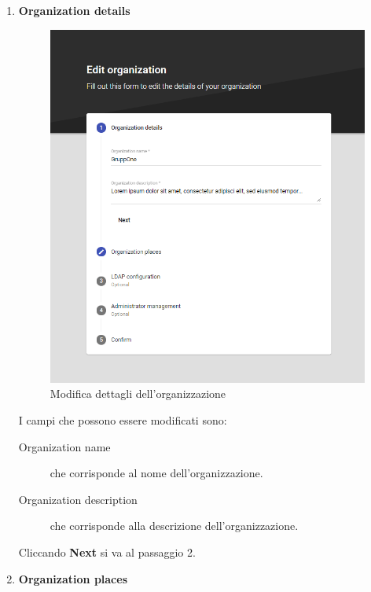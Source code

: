 \documentclass[../manuale-utente.tex]{subfiles}
\begin{document}
\begin{enumerate}
    \item \textbf{Organization details}
    
    \begin{figure}[H]
        \centering
        \includegraphics[width=120mm]{img/web-app/edit-organization/1-dettagli-organizzazione.png}
        \caption{Modifica dettagli dell'organizzazione}%
        \label{fig:web_app_modifica_dettagli_organizzazione}
    \end{figure}

    I campi che possono essere modificati sono:
    \begin{description}
        \item[Organization name] che corrisponde al nome dell'organizzazione.
        \item[Organization description] che corrisponde alla descrizione dell'organizzazione.  
    \end{description}

    Cliccando \textbf{Next} si va al passaggio 2.

    \item \textbf{Organization places}
    

\end{enumerate}
\end{document}
